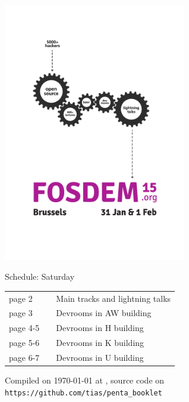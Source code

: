 \documentclass[a4paper,10pt]{article}
\begin{document}
\pagestyle{empty}
\label{cover}
\begin{center}
\includegraphics[width=0.6\textwidth]{artwork/flyer_nobg}


{\fontsize{40}{50}\selectfont
\bf

Schedule: Saturday
}

\vfill

{\huge
\begin{tabular}{lll}
page 2   & &  Main tracks and lightning talks \\
page 3   & &  Devrooms in AW building \\
page 4-5 & &  Devrooms in H building \\
page 5-6 & &  Devrooms in K building \\
page 6-7 & &  Devrooms in U building \\
\end{tabular}
}

\vfill

\end{center}

Compiled on {\ddmmyyyydate\today} at \currenttime, source code on \texttt{https://github.com/tias/penta\_booklet}


{%
\fontsize{10}{7.5}\selectfont%
\renewcommand{\arraystretch}{0.9}%
%
%
}
\end{document}

